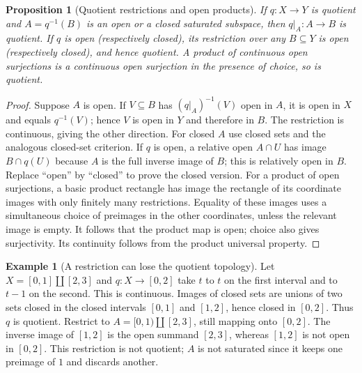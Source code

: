 \documentclass[11pt,oneside,openany]{book}
\newtheorem{proposition}[theorem]{Proposition}
\theoremstyle{definition}
\newtheorem{example}[theorem]{Example}
\theoremstyle{remark}
\begin{document}
\begin{proposition}[Quotient restrictions and open products]\label{d10:03:quotient-restriction}
If $q:X\to Y$ is quotient and $A=q^{-1}(B)$ is an open or a closed saturated subspace, then $q|_A:A\to B$ is quotient. If $q$ is open (respectively closed), its restriction over any $B\subseteq Y$ is open (respectively closed), and hence quotient. A product of continuous open surjections is a continuous open surjection in the presence of choice, so is quotient.
\end{proposition}
\begin{proof}
Suppose $A$ is open. If $V\subseteq B$ has $(q|_A)^{-1}(V)$ open in $A$, it is open in $X$ and equals $q^{-1}(V)$; hence $V$ is open in $Y$ and therefore in $B$. The restriction is continuous, giving the other direction. For closed $A$ use closed sets and the analogous closed-set criterion. If $q$ is open, a relative open $A\cap U$ has image $B\cap q(U)$ because $A$ is the full inverse image of $B$; this is relatively open in $B$. Replace ``open'' by ``closed'' to prove the closed version. For a product of open surjections, a basic product rectangle has image the rectangle of its coordinate images with only finitely many restrictions. Equality of these images uses a simultaneous choice of preimages in the other coordinates, unless the relevant image is empty. It follows that the product map is open; choice also gives surjectivity. Its continuity follows from the product universal property.
\end{proof}

\begin{example}[A restriction can lose the quotient topology]\label{d10:03:restriction-failure}
Let $X=[0,1]\coprod[2,3]$ and $q:X\to[0,2]$ take $t$ to $t$ on the first interval and to $t-1$ on the second. This is continuous. Images of closed sets are unions of two sets closed in the closed intervals $[0,1]$ and $[1,2]$, hence closed in $[0,2]$. Thus $q$ is quotient. Restrict to $A=[0,1)\coprod[2,3]$, still mapping onto $[0,2]$. The inverse image of $[1,2]$ is the open summand $[2,3]$, whereas $[1,2]$ is not open in $[0,2]$. This restriction is not quotient; $A$ is not saturated since it keeps one preimage of $1$ and discards another.
\end{example}
\end{document}
